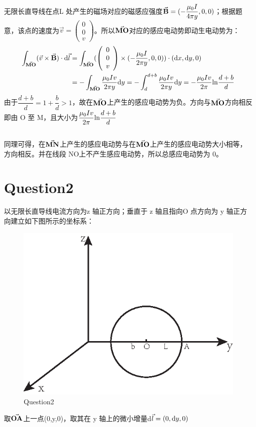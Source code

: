 \documentclass[AutoFakeBold]{article}
\begin{document}
无限长直导线在点L 处产生的磁场对应的磁感应强度$\va{B} = (-\dfrac{\mu_0 I}{4\pi y},0,0)$；根据题意，该点的速度为$\vec{v} = \left(\begin{array}{c}
	0\\
	0\\
	v
\end{array}\right)$。所以$\va{MO}$对应的感应电动势即动生电动势为：
\begin{align*}
			\int_{\va{MO}} (\vec{v} \times \va{B} )\cdot \ce{d}\vec{l} & = \int_{\va{MO}} ( \left(\begin{array}{c}
	0\\
	0\\
	v
\end{array}\right) \times (-\dfrac{\mu_0 I}{2\pi y},0,0) )\cdot(\ce{d}x,\ce{d}y,0)\\
& = -\int_{\va{MO}}\dfrac{\mu_0 Iv}{2\pi y}\ce{d}y = -\int_{d}^{d+b}\dfrac{\mu_0 Iv}{2\pi y}\ce{d}y =- \dfrac{\mu_0 Iv}{2\pi }\ce{ln}\frac{d+b}{d}
\end{align*}
由于$\dfrac{d+b}{d} = 1+\dfrac{b}{d} > 1$，故在$\va{MO}$上产生的感应电动势为负。方向与$\va{MO}$方向相反即由 O 至 M，且大小为$\dfrac{\mu_0 Iv}{2\pi }\ce{ln}\dfrac{d+b}{d}$
\subsection{ }
同理可得，在$\va{MN}$上产生的感应电动势与在$\va{MO}$上产生的感应电动势大小相等，方向相反。并在线段 NO上不产生感应电动势，所以总感应电动势为 0。
\section{Question2}
以无限长直导线电流方向为z 轴正方向；垂直于 z 轴且指向O 点方向为 y 轴正方向建立如下图所示的坐标系：
\begin{center}
\begin{figure}[h]
	\centering
	\includegraphics[scale = 0.7]{f2}
	\caption{Question2}
\end{figure}

\end{center}
取$\va{OA}$上一点(0,y,0)，取其在 y 轴上的微小增量d$\vec{l} = (0,\ce{d}y,0)$
\end{document}
